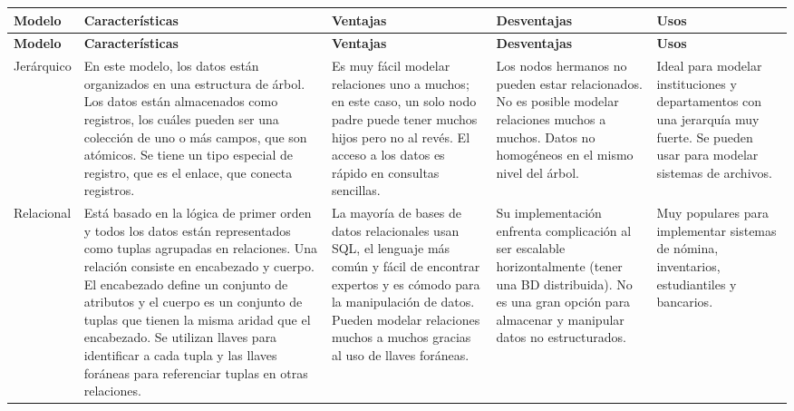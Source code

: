 \documentclass[12pt]{report}
\begin{document}
\begin{enumerate}[label=\textbf{\arabic*.}, leftmargin=*]
\begin{enumerate}[label=\textbf{\alph*.}, leftmargin=*, itemsep=1.0em]
\begin{itemize}
  \begin{longtable}{|p{2.5cm}|p{3.5cm}|p{3.5cm}|p{3.5cm}|p{3.5cm}|}
        \hline
        \textbf{Modelo} & \textbf{Características} & \textbf{Ventajas} & \textbf{Desventajas} & \textbf{Usos} \\
        \hline
        \endfirsthead

        \hline
        \textbf{Modelo} & \textbf{Características} & \textbf{Ventajas} & \textbf{Desventajas} & \textbf{Usos} \\
        \hline
        \endhead

        \hline
        \endfoot

        \hline
        \endlastfoot

        Jerárquico & En este modelo, los datos están organizados en una estructura de árbol. Los datos están almacenados como registros, los cuáles pueden ser una colección de uno o más campos, que son atómicos. Se tiene un tipo especial de registro, que es el enlace, que conecta registros. & Es muy fácil modelar relaciones uno a muchos; en este caso, un solo nodo padre puede tener muchos hijos pero no al revés. El acceso a los datos es rápido en consultas sencillas. & Los nodos hermanos no pueden estar relacionados. No es posible modelar relaciones muchos a muchos. Datos no homogéneos en el mismo nivel del árbol. & Ideal para modelar instituciones y departamentos con una jerarquía muy fuerte. Se pueden usar para modelar sistemas de archivos. \\
        \hline

        Relacional & Está basado en la lógica de primer orden y todos los datos están representados como tuplas agrupadas en relaciones. Una relación consiste en encabezado y cuerpo. El encabezado define un conjunto de atributos y el cuerpo es un conjunto de tuplas que tienen la misma aridad que el encabezado. Se utilizan llaves para identificar a cada tupla y las llaves foráneas para referenciar tuplas en otras relaciones. & La mayoría de bases de datos relacionales usan SQL, el lenguaje más común y fácil de encontrar expertos y es cómodo para la manipulación de datos. Pueden modelar relaciones muchos a muchos gracias al uso de llaves foráneas. & Su implementación enfrenta complicación al ser escalable horizontalmente (tener una BD distribuida). No es una gran opción para almacenar y manipular datos no estructurados. & Muy populares para implementar sistemas de nómina, inventarios, estudiantiles y bancarios. \\
        \hline


\end{longtable}
\end{itemize}
\end{enumerate}
\end{enumerate}
\end{document}
